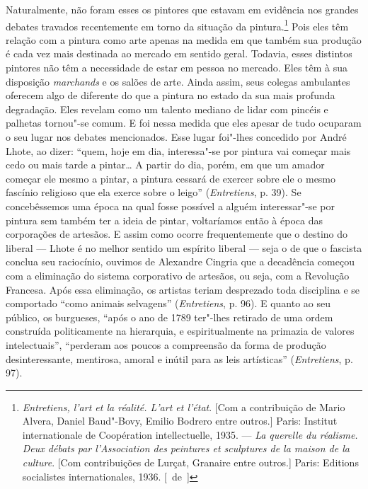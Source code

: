 Naturalmente, não foram esses os pintores que estavam em evidência nos
grandes debates travados recentemente em torno da situação da
pintura.\footnote{\emph{Entretiens, l'art et la réalité. L'art et
  l'état}. {[}Com a contribuição de Mario Alvera, Daniel Baud"-Bovy,
  Emilio Bodrero entre outros.{]} Paris: Institut internationale de
  Coopération intellectuelle, 1935. --- \emph{La querelle du réalisme.
  Deux débats par l'Association des peintures et sculptures de la maison
  de la culture}. {[}Com contribuições de Lurçat, Granaire entre
  outros.{]} Paris: Editions socialistes internationales, 1936. [~de~]} Pois eles
têm relação com a pintura como arte apenas na medida em
que também sua produção é cada vez mais destinada ao mercado em sentido
geral. Todavia, esses distintos pintores não têm a necessidade de estar
em pessoa no mercado. Eles têm à sua disposição \emph{marchands} e os
salões de arte. Ainda assim, seus colegas ambulantes oferecem algo de
diferente do que a pintura no estado da sua mais profunda degradação.
Eles revelam como um talento mediano de lidar com pincéis e palhetas
tornou"-se comum. E foi nessa medida que eles apesar de tudo ocuparam o seu
lugar nos debates mencionados. Esse lugar foi"-lhes concedido por André
Lhote, ao dizer: ``quem, hoje em dia, interessa"-se por pintura vai começar
mais cedo ou mais tarde a pintar\ldots{} A partir do dia, porém, em que um
amador começar ele mesmo a pintar, a pintura cessará de exercer sobre ele o
mesmo fascínio religioso que ela exerce sobre o leigo''
(\emph{Entretiens}, p. 39). Se concebêssemos uma época na qual fosse
possível a alguém interessar"-se por pintura sem também ter a ideia de pintar, voltaríamos então à época das corporações de
artesãos. E assim como ocorre frequentemente que o destino do liberal --- Lhote é
no melhor sentido um espírito liberal --- seja o de que o fascista conclua seu
raciocínio, ouvimos de Alexandre Cingria que a decadência começou com a
eliminação do sistema corporativo de artesãos, ou seja, com a Revolução
Francesa. Após essa eliminação, os artistas teriam desprezado toda
disciplina e se comportado ``como animais selvagens''
(\emph{Entretiens}, p. 96). E quanto ao seu público, os burgueses,
``após o ano de 1789 ter"-lhes retirado de uma ordem construída
politicamente na hierarquia, e espiritualmente na primazia de valores
intelectuais'', ``perderam aos poucos a compreensão da forma de produção
desinteressante, mentirosa, amoral e inútil para as leis artísticas'' (\emph{Entretiens}, p. 97).

